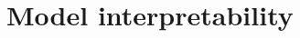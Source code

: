 \documentclass[../main.tex]{subfiles}
\begin{document}
\section{Model interpretability}



\end{document}
